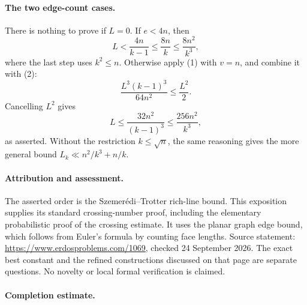 \paragraph{The two edge-count cases.}
There is nothing to prove if \(L=0\). If \(e<4n\), then
\[
 L<\frac{4n}{k-1}\leq\frac{8n}{k}
 \leq\frac{8n^2}{k^3},
\]
where the last step uses \(k^2\leq n\).
Otherwise apply (1) with \(v=n\), and combine it with (2):
\[
 \frac{L^3(k-1)^3}{64n^2}\leq\frac{L^2}{2}.
\]
Cancelling \(L^2\) gives
\[
 L\leq\frac{32n^2}{(k-1)^3}
 \leq\frac{256n^2}{k^3},
\]
as asserted. Without the restriction \(k\leq\sqrt n\), the same reasoning gives the more general bound
\(L_k\ll n^2/k^3+n/k\).

\paragraph{Attribution and assessment.}
The asserted order is the Szemer\'edi--Trotter rich-line bound. This exposition supplies its standard crossing-number proof, including the elementary probabilistic proof of the crossing estimate. It uses the planar graph edge bound, which follows from Euler's formula by counting face lengths. Source statement: \url{https://www.erdosproblems.com/1069}, checked 24 September 2026. The exact best constant and the refined constructions discussed on that page are separate questions. No novelty or local formal verification is claimed.

\paragraph{Completion estimate.}
